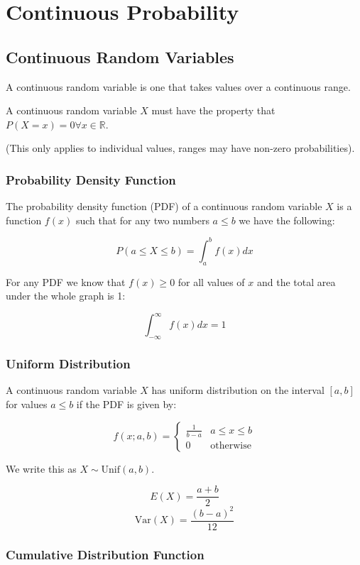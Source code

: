\section{Continuous Probability}

\subsection{Continuous Random Variables}

A continuous random variable is one that takes values over a continuous range.

A continuous random variable $X$ must have the property that $P(X=x)=0 \forall x \in \mathbb{R}$.

(This only applies to individual values, ranges may have non-zero probabilities).

\subsubsection{Probability Density Function}

The probability density function (PDF) of a continuous random variable $X$ is a function $f(x)$ such that for any two numbers $a\leq b$ we have the following:

$$ P(a \leq X \leq b) = \int_a^b f(x) dx $$

For any PDF we know that $f(x) \geq 0$ for all values of $x$ and the total area under the whole graph is 1:

$$ \int_{-\infty}^{\infty} f(x) dx = 1 $$

\subsubsection{Uniform Distribution}

A continuous random variable $X$ has uniform distribution on the interval $[a,b]$ for values $a \leq b$ if the PDF is given by:

$$ f(x; a,b) = \begin{cases} \frac{1}{b-a} & a \leq x \leq b \\ 0 & \text{otherwise} \end{cases} $$

We write this as $X \sim \text{Unif}(a,b)$.

$$ E(X) = \frac{a+b}{2} $$
$$ \text{Var}(X) = \frac{(b-a)^2}{12} $$

\subsubsection{Cumulative Distribution Function}

